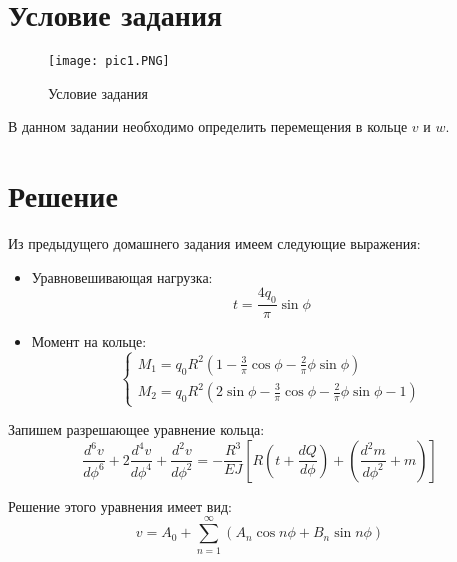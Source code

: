 \section{Условие задания}

\begin{figure}[H]
    \begin{center}
        \texttt{[image: pic1.PNG]}
        \caption{Условие задания}
        \label{pic1}
    \end{center}
\end{figure}

В данном задании необходимо определить перемещения в кольце $v$ и $w$.

\section{Решение}

Из предыдущего домашнего задания имеем следующие выражения:
\begin{itemize}
    \item Уравновешивающая нагрузка:
    \begin{equation}
        \label{eq0}
        t = \frac{4q_0}{\pi} \sin \phi
    \end{equation}
    \item Момент на кольце:
    \begin{equation}
        \label{eq0.1}
        \begin{cases}
            \displaystyle M_1 = q_0R^2 \left( 1 - \frac{3}{\pi} \cos \phi - \frac{2}{\pi} \phi \sin \phi \right)
            \\[10pt]
            \displaystyle M_2 = q_0R^2 \left( 2 \sin \phi - \frac{3}{\pi} \cos \phi - \frac{2}{\pi} \phi \sin \phi - 1 \right)
        \end{cases}
    \end{equation}
\end{itemize}

Запишем разрешающее уравнение кольца:
\begin{equation}
    \label{eq1}
    \frac{d^6 v}{d \phi^6} + 2\frac{d^4 v}{d \phi^4} + \frac{d^2 v}{d \phi^2} = - \frac{R^3}{EJ} \left[ R \left( t + \frac{dQ}{d \phi} \right) + \left( \frac{d^2 m}{d \phi^2} + m \right) \right]
\end{equation}

Решение этого уравнения имеет вид:
\begin{equation}
    \label{eq2}
    v = A_0 + \sum_{n = 1}^{\infty} \left( A_n \cos n \phi + B_n \sin n \phi \right)
\end{equation}

